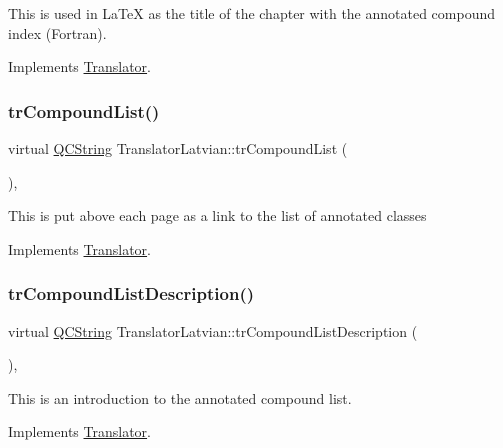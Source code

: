 This is used in La\+TeX as the title of the chapter with the annotated compound index (Fortran). 

Implements \mbox{\hyperlink{class_translator}{Translator}}.

\mbox{\label{class_translator_latvian_a774912f9063889456a8398f9cade2081}} 
\subsubsection{\texorpdfstring{trCompoundList()}{trCompoundList()}}
{\footnotesize\ttfamily virtual \mbox{\hyperlink{class_q_c_string}{Q\+C\+String}} Translator\+Latvian\+::tr\+Compound\+List (\begin{DoxyParamCaption}{ }\end{DoxyParamCaption})\hspace{0.3cm}{\ttfamily [inline]}, {\ttfamily [virtual]}}

This is put above each page as a link to the list of annotated classes 

Implements \mbox{\hyperlink{class_translator}{Translator}}.

\mbox{\label{class_translator_latvian_af7d2f321f2962b8b056af6dd439a761d}} 
\subsubsection{\texorpdfstring{trCompoundListDescription()}{trCompoundListDescription()}}
{\footnotesize\ttfamily virtual \mbox{\hyperlink{class_q_c_string}{Q\+C\+String}} Translator\+Latvian\+::tr\+Compound\+List\+Description (\begin{DoxyParamCaption}{ }\end{DoxyParamCaption})\hspace{0.3cm}{\ttfamily [inline]}, {\ttfamily [virtual]}}

This is an introduction to the annotated compound list. 

Implements \mbox{\hyperlink{class_translator}{Translator}}.

\mbox{\label{class_translator_latvian_ad11ecc4782761f738ff844d953956665}} 
